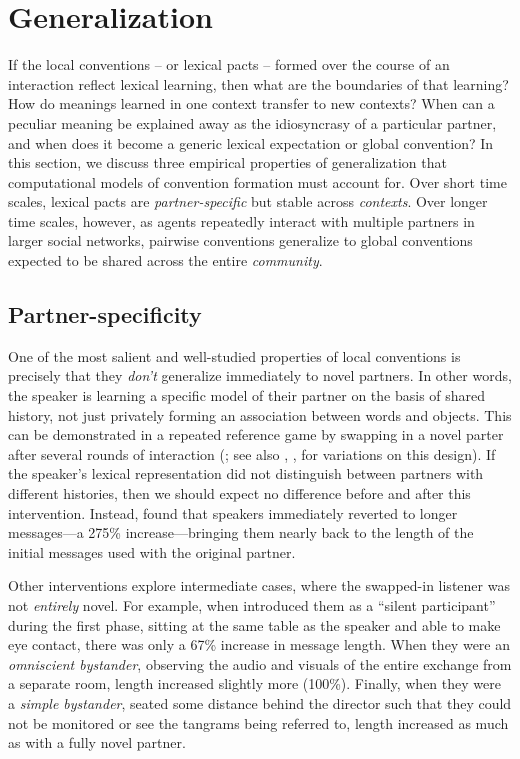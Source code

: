 \documentclass[11pt, floatsintext, jou]{apa6}
\begin{document}
\section{Generalization}

If the local conventions -- or lexical pacts -- formed over the course of an interaction reflect lexical learning, then what are the boundaries of that learning? How do meanings learned in one context transfer to new contexts? When can a peculiar meaning be explained away as the idiosyncrasy of a particular partner, and when does it become a generic lexical expectation or global convention? In this section, we discuss three empirical properties of generalization that computational models of convention formation must account for. Over short time scales, lexical pacts are \emph{partner-specific} but stable across \emph{contexts}. Over longer time scales, however, as agents repeatedly interact with multiple partners in larger social networks, pairwise conventions generalize to global conventions expected to be shared across the entire \emph{community}.

\subsection{Partner-specificity}

One of the most salient and well-studied properties of local conventions is precisely that they \emph{don't} generalize immediately to novel partners. In other words, the speaker is learning a specific model of their partner on the basis of shared history, not just privately forming an association between words and objects. This can be demonstrated in a repeated reference game by  swapping in a novel parter after several rounds of interaction (; see also , ,  for variations on this design). If the speaker's lexical representation did not distinguish between partners with different histories, then we should expect no difference before and after this intervention. Instead,  found that speakers immediately reverted to longer messages---a 275\% increase---bringing them nearly back to the length of the initial messages used with the original partner. 

Other interventions explore intermediate cases, where the swapped-in listener was not \emph{entirely} novel. For example, when  introduced them as a ``silent participant'' during the first phase, sitting at the same table as the speaker and able to make eye contact, there was only a 67\% increase in message length. When they were an \emph{omniscient bystander}, observing the audio and visuals of the entire exchange from a separate room, length increased slightly more (100\%). Finally, when they were a \emph{simple bystander}, seated some distance behind the director such that they could not be monitored or see the tangrams being referred to, length increased as much as with a fully novel partner. 
\end{document}

